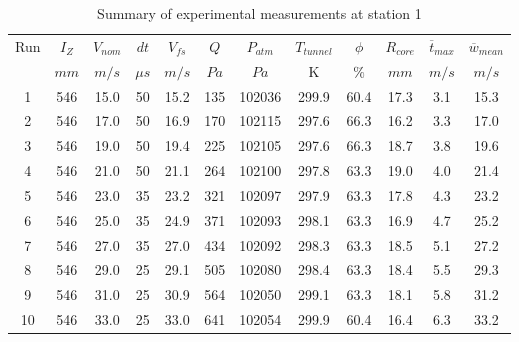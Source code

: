 \begin{table}[H]
\begin{center}
\begin{tabular}{|cccccccccccc|}
	\hline
	Run & $I_Z$ & $V_{nom}$ & $dt$ & $V_{fs}$ & $Q$ & $P_{atm}$ & $T_{tunnel}$ & $\phi$ & $R_{core}$ & $\overline{t}_{max}$ & $\overline{w}_{mean}$\\
	  & $mm$ & $m/s$ & $\mu s$ & $m/s$ & $Pa$ & $Pa$ & K & $\%$ & $mm$ & $m/s$ & $m/s$\\
	\hline
	1 & 546 & 15.0 & 50 & 15.2 & 135 & 102036 & 299.9 & 60.4 & 17.3 & 3.1 & 15.3\\
	2 & 546 & 17.0 & 50 & 16.9 & 170 & 102115 & 297.6 & 66.3 & 16.2 & 3.3 & 17.0\\
	3 & 546 & 19.0 & 50 & 19.4 & 225 & 102105 & 297.6 & 66.3 & 18.7 & 3.8 & 19.6\\
	4 & 546 & 21.0 & 50 & 21.1 & 264 & 102100 & 297.8 & 63.3 & 19.0 & 4.0 & 21.4\\
	5 & 546 & 23.0 & 35 & 23.2 & 321 & 102097 & 297.9 & 63.3 & 17.8 & 4.3 & 23.2\\
	6 & 546 & 25.0 & 35 & 24.9 & 371 & 102093 & 298.1 & 63.3 & 16.9 & 4.7 & 25.2\\
	7 & 546 & 27.0 & 35 & 27.0 & 434 & 102092 & 298.3 & 63.3 & 18.5 & 5.1 & 27.2\\
	8 & 546 & 29.0 & 25 & 29.1 & 505 & 102080 & 298.4 & 63.3 & 18.4 & 5.5 & 29.3\\
	9 & 546 & 31.0 & 25 & 30.9 & 564 & 102050 & 299.1 & 63.3 & 18.1 & 5.8 & 31.2\\
	10 & 546 & 33.0 & 25 & 33.0 & 641 & 102054 & 299.9 & 60.4 & 16.4 & 6.3 & 33.2\\
	\hline
\end{tabular}
\caption{Summary of experimental measurements at station 1}
\label{table:experiment_results_1}
\end{center}
\end{table}
